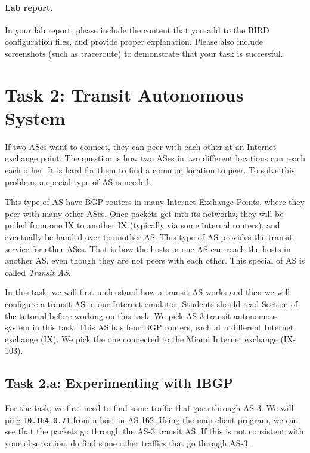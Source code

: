 \paragraph{Lab report.}
In your lab report, please include the content that you add to the 
BIRD configuration files, and provide proper explanation.
Please also include screenshots (such as traceroute) to demonstrate 
that your task is successful. 



\section{Task 2: Transit Autonomous System} 

If two ASes want to connect, they can peer with each other
at an Internet exchange point. The question is how two ASes in two different locations
can reach each other. It is hard for them
to find a common location to peer. To solve this problem,
a special type of AS is needed.

This type of AS have BGP routers in many Internet
Exchange Points, where they peer with many other ASes. Once packets get into
its networks, they will be pulled from one IX to another IX (typically via
some internal routers), and eventually be
handed over to another AS. This type of AS provides the transit
service for other ASes. That is how the hosts in one AS can reach the hosts in
another AS, even though they are not peers with each other.
This special of AS is called \textit{Transit AS}.

In this task, we will first understand how a transit AS works and
then we will configure a transit AS in our Internet emulator. 
Students should read Section \transitas of the tutorial before working on this task.
We pick AS-3 transit autonomous system in this 
task. This AS has four BGP routers, each at a different 
Internet exchange (IX).
We pick the one connected to the Miami Internet exchange (IX-103).

\subsection{Task 2.a: Experimenting with IBGP} 

For the task, we first need to find some traffic that 
goes through AS-3. We will ping \texttt{10.164.0.71} from a host in AS-162. Using the 
map client program, we can see that the packets go through
the AS-3 transit AS. If this is not consistent with your observation,
do find some other traffics that go through AS-3. 

